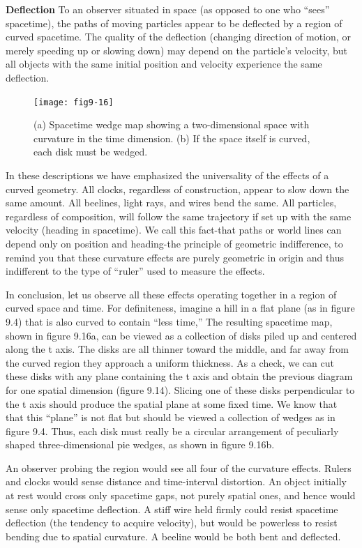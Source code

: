 \documentclass{book}
\begin{document}
\noindent \textbf{Deflection} To an observer situated in space (as opposed to one who
``sees'' spacetime), the paths of moving particles appear to be deflected
by a region of curved spacetime. The quality of the deflection (changing
direction of motion, or merely speeding up or slowing down) may depend
on the particle's velocity, but all objects with the same initial position
and velocity experience the same deflection.

\begin{figure}
\begin{center}
\texttt{[image: fig9-16]}
\caption{(a) Spacetime wedge map showing a two-dimensional space with curvature in the time dimension. (b) If the space itself is curved, each disk must be wedged.}
\end{center}
\end{figure}

In these descriptions we have emphasized the universality of the effects
of a curved geometry. All clocks, regardless of construction, appear to
slow down the same amount. All beelines, light rays, and wires bend
the same. All particles, regardless of composition, will follow the same
trajectory if set up with the same velocity (heading in spacetime). We
call this fact-that paths or world lines can depend only on position
and heading-the principle of geometric indifference, to remind you that
these curvature effects are purely geometric in origin and thus indifferent
to the type of ``ruler'' used to measure the effects.

In conclusion, let us observe all these effects operating together in a
region of curved space and time. For definiteness, imagine a hill in a
flat plane (as in figure 9.4) that is also curved to contain ``less time,''
The resulting spacetime map, shown in figure 9.16a, can be viewed
as a collection of disks piled up and centered along the t axis. The
disks are all thinner toward the middle, and far away from the curved
region they approach a uniform thickness. As a check, we can cut
these disks with any plane containing the t axis and obtain the previous
diagram for one spatial dimension (figure 9.14). Slicing one of these
disks perpendicular to the t axis should produce the spatial plane at
some fixed time. We know that that this ``plane'' is not flat but should
be viewed a collection of wedges as in figure 9.4. Thus, each disk must
really be a circular arrangement of peculiarly shaped three-dimensional
pie wedges, as shown in figure 9.16b.

An observer probing the region would see all four of the curvature
effects. Rulers and clocks would sense distance and time-interval distortion. An object initially at rest would cross only spacetime gaps, not
purely spatial ones, and hence would sense only spacetime deflection. A
stiff wire held firmly could resist spacetime deflection (the tendency to
acquire velocity), but would be powerless to resist bending due to spatial
curvature. A beeline would be both bent and deflected.
\end{document}
